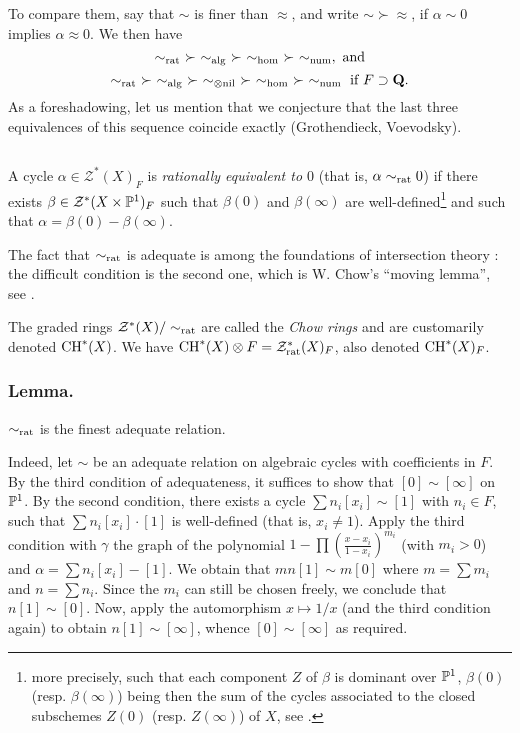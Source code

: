 \documentclass[../main.tex]{subfiles}
\begin{document}
To compare them, say that $\sim$ is finer than $\approx$, and write $\sim \succ \approx$, if $\alpha \sim 0$ implies $\alpha \approx 0$. We then have
$$\sim_{\rat}\ \succ\ \sim_{\alg}\ \succ\ \sim_{\hom}\ \succ\ \sim_{\num},\text{ and}$$
$$\sim_{\rat}\ \succ\ \sim_{\alg}\ \succ\ \sim_{\otimes\nil}\ \succ\ \sim_{\hom}\ \succ\ \sim_{\num}\text{ if } F \supset \Q.$$
As a foreshadowing, let us mention that we conjecture that the last three equivalences of this sequence coincide exactly (Grothendieck, Voevodsky).

\subsection{} A cycle $\alpha \in \mathcal{Z}^*(X)_F$ is \emph{rationally equivalent to $0$} (that is, $\alpha \sim_{\rat} 0$) if there exists $\beta \in \mathcal{Z}^*(X \times \P^1)_F$ such that $\beta(0)$ and $\beta(\infty)$ are well-defined\footnote{more precisely, such that each component $Z$ of $\beta$ is dominant over $\P^1$, $\beta(0)$ (resp. $\beta(\infty)$) being then the sum of the cycles associated to the closed subschemes $Z(0)$ (resp. $Z(\infty)$) of $X$, see \cite{fu84}.} and such that $\alpha = \beta(0) - \beta(\infty)$.

The fact that $\sim_{\rat}$ is adequate is among the foundations of intersection theory : the difficult condition is the second one, which is W. Chow's \enquote{moving lemma}, see \cite{fu84}.

The graded rings $\mathcal{Z}^*(X)/\sim_{\rat}$ are called the \emph{Chow rings} and are customarily denoted $\CH^*(X)$.
We have $\CH^*(X) \otimes F = \mathcal{Z}^*_{\rat}(X)_F$, also denoted $\CH^*(X)_F$.

\subsubsection{Lemma.} $\sim_{\rat}$ is the finest adequate relation.

Indeed, let $\sim$ be an adequate relation on algebraic cycles with coefficients in $F$.
By the third condition of adequateness, it suffices to show that $[0] \sim [\infty]$ on $\P^1$.
By the second condition, there exists a cycle $\sum n_i[x_i] \sim [1]$ with $n_i \in F$, such that $\sum n_i[x_i] \cdot [1]$ is well-defined (that is, $x_i \neq 1$).
Apply the third condition with $\gamma$ the graph of the polynomial $1 - \prod \left(\frac{x - x_i}{1 - x_i}\right)^{m_i}$ (with $m_i > 0$) and $\alpha = \sum n_i[x_i] - [1]$.
We obtain that $mn[1] \sim m[0]$ where $m = \sum m_i$ and $n = \sum n_i$.
Since the $m_i$ can still be chosen freely, we conclude that $n[1] \sim [0]$.
Now, apply the automorphism $x \mapsto 1/x$ (and the third condition again) to obtain $n[1] \sim [\infty]$, whence $[0] \sim [\infty]$ as required.
\end{document}
